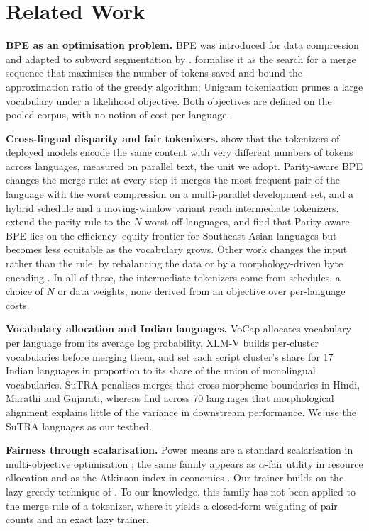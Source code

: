 \section{Related Work}
\label{sec:related}

\noindent\textbf{BPE as an optimisation problem.}
BPE was introduced for data compression \citep{gage1994} and adapted to subword
segmentation by \citet{sennrich2016}. \citet{zouhar2023} formalise it as the search for a
merge sequence that maximises the number of tokens saved and bound the approximation ratio
of the greedy algorithm; Unigram tokenization \citep{kudo2018} prunes a large vocabulary
under a likelihood objective. Both objectives are defined on the pooled corpus, with no
notion of cost per language.

\noindent\textbf{Cross-lingual disparity and fair tokenizers.}
\citet{petrov2023} show that the tokenizers of deployed models encode the same content with
very different numbers of tokens across languages, measured on parallel text, the unit we
adopt. Parity-aware BPE \citep{foroutan2026} changes the merge rule: at every step it merges
the most frequent pair of the language with the worst compression on a multi-parallel
development set, and a hybrid schedule and a moving-window variant reach intermediate
tokenizers. \citet{kanjirangat2026} extend the parity rule to the $N$ worst-off languages,
and \citet{lee2026} find that Parity-aware BPE lies on the efficiency--equity frontier for
Southeast Asian languages but becomes less equitable as the vocabulary grows. Other work
changes the input rather than the rule, by rebalancing the data \citep{chung2023unimax} or
by a morphology-driven byte encoding \citep{limisiewicz2024myte}. In all of these, the
intermediate tokenizers come from schedules, a choice of $N$ or data weights, none derived
from an objective over per-language costs.

\noindent\textbf{Vocabulary allocation and Indian languages.}
VoCap \citep{zheng2021vocap} allocates vocabulary per language from its average log
probability, XLM-V \citep{liang2023xlmv} builds per-cluster vocabularies before merging
them, and \citet{brahma2026} set each script cluster's share for 17 Indian languages in
proportion to its share of the union of monolingual vocabularies. SuTRA \citep{rathore2026}
penalises merges that cross morpheme boundaries in Hindi, Marathi and Gujarati, whereas
\citet{arnett2025} find across 70 languages that morphological alignment explains little of
the variance in downstream performance. We use the SuTRA languages as our testbed.

\noindent\textbf{Fairness through scalarisation.}
Power means are a standard scalarisation in multi-objective optimisation
\citep{miettinen1999}; the same family appears as $\alpha$-fair utility in resource
allocation \citep{mo2000fair} and as the Atkinson index in economics \citep{atkinson1970}.
Our trainer builds on the lazy greedy technique of \citet{minoux1978}. To our knowledge,
this family has not been applied to the merge rule of a tokenizer, where it yields a
closed-form weighting of pair counts and an exact lazy trainer.
